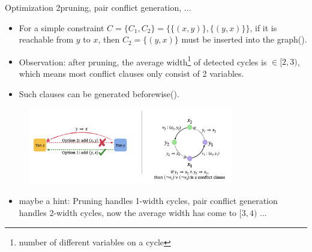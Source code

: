 \begin{frame}{Optimization 2}{pruning, pair conflict generation, ...}
	\scriptsize{
		\begin{itemize}
			\item For a simple constraint $C = \{C_1, C_2\} = \{\{(x, y)\}, \{(y, x)\}\}$, if it is reachable from $y$ to $x$, then $C_2 = \{(y, x)\}$ must be inserted into the graph().
			\item Observation: after pruning, the average width\footnote{\tiny{number of different variables on a cycle}} of detected cycles is $\in [2, 3)$, which means most conflict clauses only consist of 2 variables.
			\item Such clauses can be generated beforewise().
		\end{itemize}
	}

	\begin{figure}[H]
		\centering
		\includegraphics[width=0.8\textwidth]{figs/pruning-and-pair-conflict-generation.png}
	\end{figure}

	\begin{itemize}
		\item maybe a hint: Pruning handles 1-width cycles, pair conflict generation handles 2-width cycles, now the average width has come to $[3, 4)$ ...
	\end{itemize}
\end{frame}

